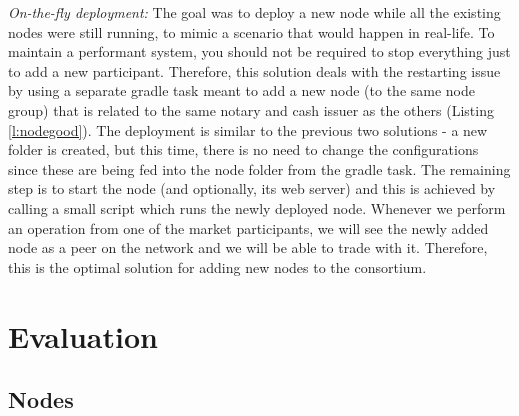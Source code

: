 \documentclass[12pt,twoside]{article}
\begin{document}
\textit{On-the-fly deployment:} The goal was to deploy a new node while all the existing nodes were still running, to mimic a scenario that would happen in real-life. To maintain a performant system, you should not be required to stop everything just to add a new participant. Therefore, this solution deals with the restarting issue by using a separate gradle task meant to add a new node (to the same node group) that is related to the same notary and cash issuer as the others (Listing \ref{l:nodegood}). The deployment is similar to the previous two solutions - a new folder is created, but this time, there is no need to change the configurations since these are being fed into the node folder from the gradle task. The remaining step is to start the node (and optionally, its web server) and this is achieved by calling a small script which runs the newly deployed node. Whenever we perform an operation from one of the market participants, we will see the newly added node as a peer on the network and we will be able to trade with it. Therefore, this is the optimal solution for adding new nodes to the consortium. 

\newpage
\section{Evaluation}
\label{sec:Evaluation}

\subsection{Nodes}
\label{sub:Nodes}
\end{document}
